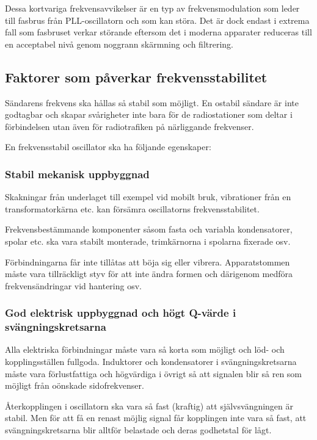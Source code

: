 Dessa kortvariga frekvensavvikelser är en typ av frekvensmodulation
som leder till fasbrus från PLL-oscillatorn och som kan störa.
Det är dock endast i extrema fall som fasbruset verkar störande eftersom det
i moderna apparater reduceras till en acceptabel nivå genom noggrann
skärmning och filtrering.

\subsection{Faktorer som påverkar frekvensstabilitet}

Sändarens frekvens ska hållas så stabil som möjligt.
En ostabil sändare är inte godtagbar och skapar svårigheter inte bara för de
radiostationer som deltar i förbindelsen utan även för radiotrafiken
på närliggande frekvenser.

En frekvensstabil oscillator ska ha följande egenskaper:

\subsubsection{Stabil mekanisk uppbyggnad}

Skakningar från underlaget till exempel vid mobilt bruk, vibrationer från en
transformatorkärna etc. kan försämra oscillatorns frekvensstabilitet.

Frekvensbestämmande komponenter såsom fasta och variabla kondensatorer, spolar
etc. ska vara stabilt monterade, trimkärnorna i spolarna fixerade osv.

Förbindningarna får inte tillåtas att böja sig eller vibrera.
Apparatstommen måste vara tillräckligt styv för att inte ändra formen och
därigenom medföra frekvensändringar vid hantering osv.

\subsubsection{God elektrisk uppbyggnad och högt Q-värde i svängningskretsarna}

Alla elektriska förbindningar måste vara så korta som möjligt och löd-
och kopplingsställen fullgoda.
Induktorer och kondensatorer i svängningskretsarna måste vara förlustfattiga
och högvärdiga i övrigt så att signalen blir så ren som möjligt från oönskade
sidofrekvenser.

Återkopplingen i oscillatorn ska vara så fast (kraftig) att självsvängningen
är stabil.
Men för att få en renast möjlig signal får kopplingen inte vara så fast,
att svängningskretsarna blir alltför belastade och deras godhetstal för lågt.

